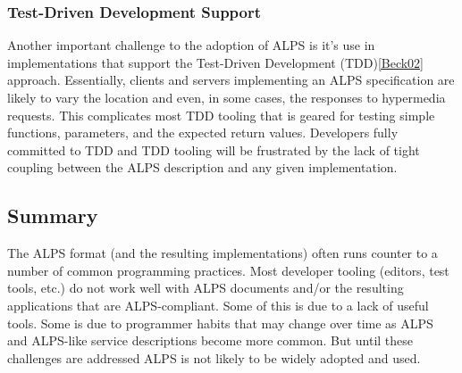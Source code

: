 \documentclass{wsrest2014}
\begin{document}
\subsubsection{Test-Driven Development Support}
\label{_test_driven_development_support}
 \par{}Another important challenge to the adoption of ALPS is it's use in implementations that support the Test-Driven Development (TDD)\hyperlink{Beck02}{[Beck02]} approach. Essentially, clients and servers implementing an ALPS specification are likely to vary the location and even, in some cases, the responses to hypermedia requests. This complicates most TDD tooling that is geared for testing simple functions, parameters, and the expected return values. Developers fully committed to TDD and TDD tooling will be frustrated by the lack of tight coupling between the ALPS description and any given implementation.
\hypertarget{_summary_4}{}
\subsection{Summary}
\label{_summary_4}
 \par{}The ALPS format (and the resulting implementations) often runs counter to a number of common programming practices. Most developer tooling (editors, test tools, etc.) do not work well with ALPS documents and/or the resulting applications that are ALPS-compliant. Some of this is due to a lack of useful tools. Some is due to programmer habits that may change over time as ALPS and ALPS-like service descriptions become more common. But until these challenges are addressed ALPS is not likely to be widely adopted and used.
\hypertarget{_conclusion}{}
\end{document}
